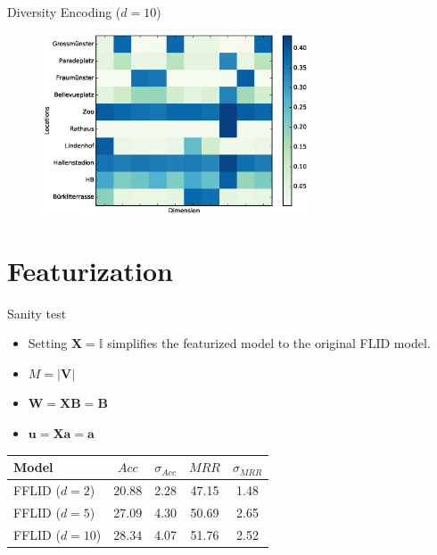 \documentclass{beamer}
\begin{document}
  \begin{frame}{Diversity Encoding ($d=10$)}
    \begin{figure}
      \includegraphics[width=0.7\textwidth]{submodular_weights_d_10}
    \end{figure}
  \end{frame}
  
  \section{Featurization}
  
  \begin{frame}{Sanity test}
    \begin{itemize}
      \item Setting $\bm{X} = \mathbb{I}$ simplifies the featurized model to the original FLID model.
      \item $M = \lvert \bm{V} \rvert$
      \item $\bm{W} = \bm{X}\bm{B} = \bm{B}$
      \item $\bm{u} = \bm{X}\bm{a} = \bm{a}$
    \end{itemize}
    \begin{table}
      \begin{tabularx}{0.7\textwidth}{X|c|c|c|c}
        Model         & $Acc$ & $\sigma_{Acc}$ & $MRR$ & $\sigma_{MRR}$ \\
        \hline
        FFLID ($d=2$)  & 20.88 & 2.28           & 47.15 & 1.48 \\
        FFLID ($d=5$)  & 27.09 & 4.30           & 50.69 & 2.65 \\
        FFLID ($d=10$) & 28.34 & 4.07           & 51.76 & 2.52
      \end{tabularx}
    \end{table}
  \end{frame}
  
\end{document}
